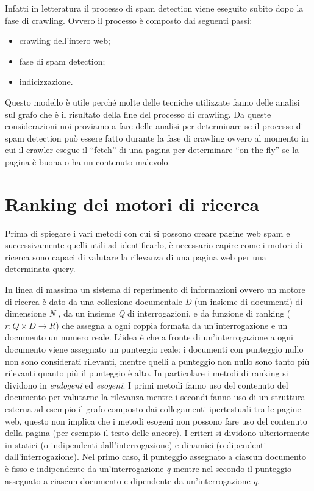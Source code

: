 Infatti in letteratura il processo di spam detection viene eseguito subito dopo la fase di crawling. Ovvero il processo è composto dai seguenti passi:
\begin{itemize}
 \item crawling dell'intero web;
 \item fase di spam detection;
 \item indicizzazione.
\end{itemize}
Questo modello è utile perché molte delle tecniche utilizzate fanno delle analisi sul grafo che è il risultato della fine del processo di crawling. Da queste considerazioni noi proviamo a fare delle analisi per determinare se il processo di spam detection può essere fatto durante la fase di crawling ovvero al momento in cui il crawler esegue il ``fetch'' di una pagina per determinare ``on the fly'' se la pagina è buona o ha un contenuto malevolo. 

\section{Ranking dei motori di ricerca}
Prima di spiegare i vari metodi con cui si possono creare pagine web spam e successivamente quelli utili ad identificarlo, è necessario capire come i motori di ricerca sono capaci di valutare la rilevanza di una pagina web per una determinata query.

In linea di massima un sistema di reperimento di informazioni ovvero un motore di ricerca è dato da una collezione documentale \textit{D} (un insieme di documenti) di dimensione \textit{N} , da un insieme \textit{Q} di interrogazioni, e da funzione di ranking (\(r : Q \times D \rightarrow R\)) che
assegna a ogni coppia formata da un’interrogazione e un documento un numero reale. L’idea è che a fronte di un’interrogazione a ogni documento viene assegnato un punteggio reale: i documenti con punteggio nullo non sono considerati rilevanti, mentre quelli a punteggio non nullo sono tanto più rilevanti quanto più il punteggio è alto. In particolare i metodi di ranking si dividono in \textit{endogeni} ed \textit{esogeni}. I primi metodi fanno uso del contenuto del documento per valutarne la rilevanza mentre i secondi fanno uso di un struttura esterna ad esempio il grafo composto dai collegamenti ipertestuali tra le pagine web, questo non implica che i metodi esogeni non possono fare uso del contenuto della pagina (per esempio il testo delle ancore). I criteri si dividono ulteriormente in statici (o indipendenti dall’interrogazione) e dinamici (o dipendenti dall’interrogazione). Nel primo caso, il punteggio assegnato a ciascun documento è fisso e indipendente da un'interrogazione \textit{q} mentre nel secondo 
il punteggio assegnato a ciascun documento e dipendente da un'interrogazione \textit{q}.


